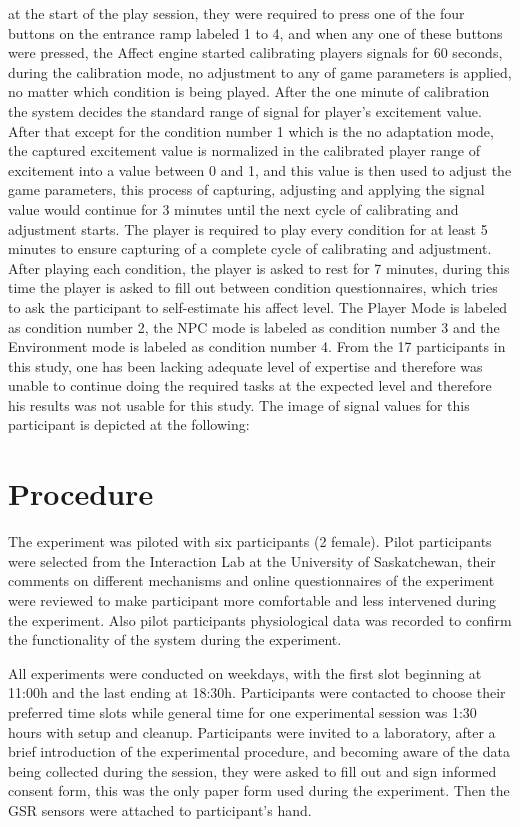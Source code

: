 \documentclass{uofsthesis-cs}
\begin{document}
at the start of the play session, they were required to press one of the four buttons on the entrance ramp labeled 1 to 4, and when any one of these buttons were pressed, the Affect engine started calibrating players signals for 60 seconds, during the calibration mode, no adjustment to any of game parameters is applied, no matter which condition is being played. After the one minute of calibration the system decides the standard range of signal for player's excitement value. After that except for the condition number 1 which is the no adaptation mode, the captured excitement value is normalized in the calibrated player range of excitement into a value between 0 and 1, and this value is then used to adjust the game parameters, this process of capturing, adjusting and applying the signal value would continue for 3 minutes until the next cycle of calibrating and adjustment starts. The player is required to play every condition for at least 5 minutes to ensure capturing of a complete cycle of calibrating and adjustment. After playing each condition, the player is asked to rest for 7 minutes, during this time the player is asked to fill out between condition questionnaires, which tries to ask the participant to self-estimate his affect level. The Player Mode is labeled as condition number 2, the NPC mode is labeled as condition number 3 and the Environment mode is labeled as condition number 4. From the 17 participants in this study, one has been lacking adequate level of expertise and therefore was unable to continue doing the required tasks at the expected level and therefore his results was not usable for this study. The image of signal values for this participant is depicted at the following:

\section{Procedure}

The experiment was piloted with six participants (2 female). Pilot participants were selected from the Interaction Lab at the University of Saskatchewan, their comments on different mechanisms and online questionnaires of the experiment were reviewed to make participant more comfortable and less intervened during the experiment. Also pilot participants physiological data was recorded to confirm the functionality of the system during the experiment.

All experiments were conducted on weekdays, with the first slot beginning at 11:00h and the last ending at 18:30h. Participants were contacted to choose their preferred time slots while general time for one experimental session was 1:30 hours with setup and cleanup. Participants were invited to a laboratory, after a brief introduction of the experimental procedure, and becoming aware of the data being collected during the session, they were asked to fill out and sign informed consent form, this was the only paper form used during the experiment. Then the GSR sensors were attached to participant's hand.
\end{document}
